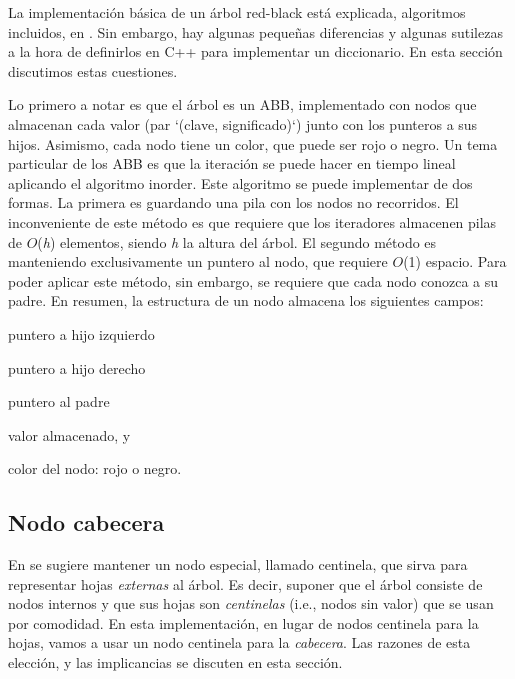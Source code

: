\-La implementación básica de un árbol red-\/black está explicada, algoritmos incluidos, en \cite{CormenLeisersonRivestStein2009}. \-Sin embargo, hay algunas pequeñas diferencias y algunas sutilezas a la hora de definirlos en \-C++ para implementar un diccionario. \-En esta sección discutimos estas cuestiones.

\-Lo primero a notar es que el árbol es un \-A\-B\-B, implementado con nodos que almacenan cada valor (par `(clave, significado)`) junto con los punteros a sus hijos. \-Asimismo, cada nodo tiene un color, que puede ser rojo o negro. \-Un tema particular de los \-A\-B\-B es que la iteración se puede hacer en tiempo lineal aplicando el algoritmo inorder. \-Este algoritmo se puede implementar de dos formas. \-La primera es guardando una pila con los nodos no recorridos. \-El inconveniente de este método es que requiere que los iteradores almacenen pilas de $O$({\itshape h\/}) elementos, siendo {\itshape h\/} la altura del árbol. \-El segundo método es manteniendo exclusivamente un puntero al nodo, que requiere $O$(1) espacio. \-Para poder aplicar este método, sin embargo, se requiere que cada nodo conozca a su padre. \-En resumen, la estructura de un nodo almacena los siguientes campos\-:
\begin{DoxyItemize}
\item puntero a hijo izquierdo
\item puntero a hijo derecho
\item puntero al padre
\item valor almacenado, y
\item color del nodo\-: rojo o negro.
\end{DoxyItemize}\hypertarget{Implementacion_Cabecera}{}\subsection{\-Nodo cabecera}\label{Implementacion_Cabecera}
\-En \cite{CormenLeisersonRivestStein2009} se sugiere mantener un nodo especial, llamado centinela, que sirva para representar hojas {\itshape externas\/} al árbol. \-Es decir, suponer que el árbol consiste de nodos internos y que sus hojas son {\itshape centinelas\/} (i.\-e., nodos sin valor) que se usan por comodidad. \-En esta implementación, en lugar de nodos centinela para la hojas, vamos a usar un nodo centinela para la {\itshape cabecera\/}. \-Las razones de esta elección, y las implicancias se discuten en esta sección.

